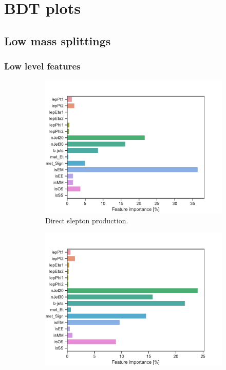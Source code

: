 \chapter{BDT plots}
\label{sec:appBDTplots}
\newpage

\section{Low mass splittings}
\subsection{Low level features}



\begin{figure}[H]
    \centering
    \begin{subfigure}[t!]{0.49\textwidth}
        \includegraphics[width = \textwidth]{Figures/SlepSlep/ML/BDT/Low_level/Low/featureImportance.pdf}
        \caption{Direct slepton production.}
        \label{fig:}
    \end{subfigure}
    \begin{subfigure}[t!]{0.49\textwidth}
        \includegraphics[width = \textwidth]{Figures/SlepSnu/BDT/Low_level/Low/featureImportance.pdf}

\end{subfigure}
\end{figure}
